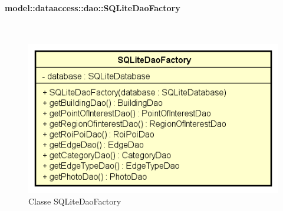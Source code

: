 \documentclass[../DefinizioneDiProdotto.tex]{subfiles}
\begin{document}
\paragraph{model::dataaccess::dao::SQLiteDaoFactory}
\
\begin{figure}[H]
	\centering
	\includegraphics[width=\maxwidth]{img/SQLiteDaoFactory.png}
	\caption{Classe SQLiteDaoFactory}\label{fig:model::dataaccess::dao::SQLiteDaoFactory} 
\end{figure}
\end{document}
